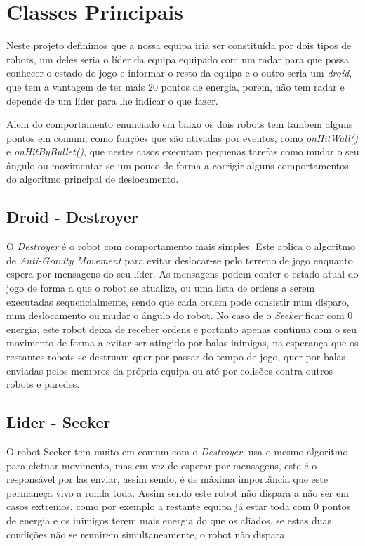 \section{Classes Principais}

Neste projeto definimos que a nossa equipa iria ser constituída por dois tipos de robots, um deles seria o líder da equipa equipado com um radar para que possa conhecer o estado do jogo e informar o resto da equipa e o outro seria um \textit{droid}, que tem a vantagem de ter mais 20 pontos de energia, porem, não tem radar e depende de um líder para lhe indicar o que fazer.

Alem do comportamento enunciado em baixo os dois robots tem tambem alguns pontos em comum, como funções que são ativadas por eventos, como \textit{onHitWall()} e \textit{onHitByBullet()}, que nestes casos executam pequenas tarefas como mudar o seu ângulo ou movimentar se um pouco de forma a corrigir alguns comportamentos do algoritmo principal de deslocamento.

\subsection{Droid - Destroyer}

O \textit{Destroyer} é o robot com comportamento mais simples. Este aplica o algoritmo de \textit{Anti-Gravity Movement} para evitar deslocar-se pelo terreno de jogo enquanto espera por mensagens do seu líder. As mensagens podem conter o estado atual do jogo de forma a que o robot se atualize, ou uma lista de ordens a serem executadas sequencialmente, sendo que cada ordem pode consistir num disparo, num deslocamento ou mudar o ângulo do robot. 
No caso de o \textit{Seeker} ficar com 0 energia, este robot deixa de receber ordens e portanto apenas continua com o seu movimento de forma a evitar ser atingido por balas inimigas, na esperança que os restantes robots se destruam quer por passar do tempo de jogo, quer por balas enviadas pelos membros da própria equipa ou até por colisões contra outros robots e paredes.

\subsection{Lider - Seeker}
O robot Seeker tem muito em comum com o \textit{Destroyer}, usa o mesmo algoritmo para efetuar movimento, mas em vez de esperar por mensagens, este é o responsável por las enviar, assim sendo, é de máxima importância que este permaneça vivo a ronda toda. Assim sendo este robot não dispara a não ser em casos extremos, como por exemplo a restante equipa já estar toda com 0 pontos de energia e os inimigos terem mais energia do que os aliados, se estas duas condições não se reunirem simultaneamente, o robot não dispara.

